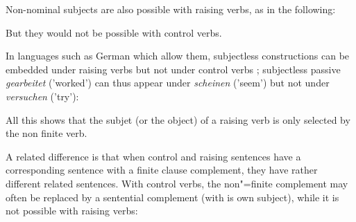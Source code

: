 \documentclass[output=paper
	        ,collection
	        ,collectionchapter
 	        ,biblatex
                ,babelshorthands
                ,newtxmath
                ,draftmode
                ,colorlinks, citecolor=brown
]{./langsci/langscibook}
\begin{document}
\eal
\judgewidth{\#}
 \label{cat1}
 \label{cat2}
 \label{cat3}
 \label{cat4}
\zl

Non-nominal subjects are also possible with raising verbs, as in the following:
 
\eal 
{}
 \label{under}
\zl

But they would not be possible with control verbs.
\eal
{}
\zl

In languages such as German which allow them, subjectless constructions can be embedded under
raising verbs but not under control verbs \citep[]{Mueller2002b}; subjectless passive \emph{gearbeitet} ('worked') can thus appear under \emph{scheinen} ('seem') but not under \emph{versuchen} ('try'):

\eal
\label{german1}
\zl
 
 All this shows that the subjet (or the object) of a raising verb is only selected by the non
 finite verb. 

A related difference is that when control and raising sentences have a corresponding sentence with a finite clause complement, they have rather different related sentences.
With control verbs, the non"=finite complement may often be replaced by a sentential complement (with is own subject), while it is not possible with raising verbs:
\end{document}

